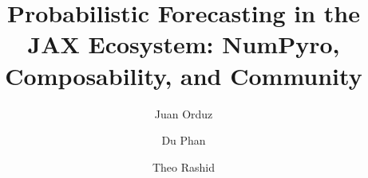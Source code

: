\documentclass[11pt,3p,authoryear]{elsarticle}
\begin{document}
\begin{frontmatter}

\title{Probabilistic Forecasting in the JAX Ecosystem:
NumPyro, Composability, and Community}

\author[jo]{Juan Orduz}
\author[gdm]{Du Phan}
\author[amzn]{Theo Rashid}

\address[jo]{PyMC Labs, [Germany]}
\address[gdm]{[United States]}
\address[amzn]{Amazon, [United States]}


\end{frontmatter}
\end{document}
